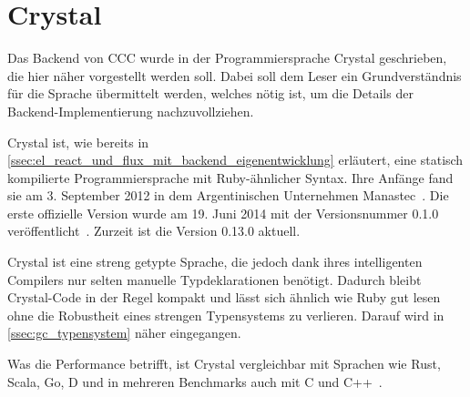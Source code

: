 \section{Crystal}
\label{sec:g_crystal}

Das Backend von CCC wurde in der Programmiersprache Crystal geschrieben, die
hier näher vorgestellt werden soll.  Dabei soll dem Leser ein Grundverständnis
für die Sprache übermittelt werden, welches nötig ist, um die Details der
Backend-Implementierung nachzuvollziehen.

Crystal ist, wie bereits in
\cref{ssec:el_react_und_flux_mit_backend_eigenentwicklung} erläutert, eine
statisch kompilierte Programmiersprache mit Ruby-ähnlicher Syntax.  Ihre Anfänge
fand sie am 3. September 2012 in dem Argentinischen Unternehmen
Manastec~\cite{crystalbd}.  Die erste offizielle Version wurde am 19. Juni 2014
mit der Versionsnummer 0.1.0 veröffentlicht~\cite{crystal010}.  Zurzeit ist die
Version 0.13.0 aktuell.

Crystal ist eine streng getypte Sprache, die jedoch dank ihres intelligenten
Compilers nur selten manuelle Typdeklarationen benötigt.  Dadurch bleibt
Crystal-Code in der Regel kompakt und lässt sich ähnlich wie Ruby gut lesen ohne
die Robustheit eines strengen Typensystems zu verlieren.  Darauf wird in
\cref{ssec:gc_typensystem} näher eingegangen.

Was die Performance betrifft, ist Crystal vergleichbar mit Sprachen wie Rust,
Scala, Go, D und in mehreren Benchmarks auch mit C und C++~\cite{benchmarks}.




